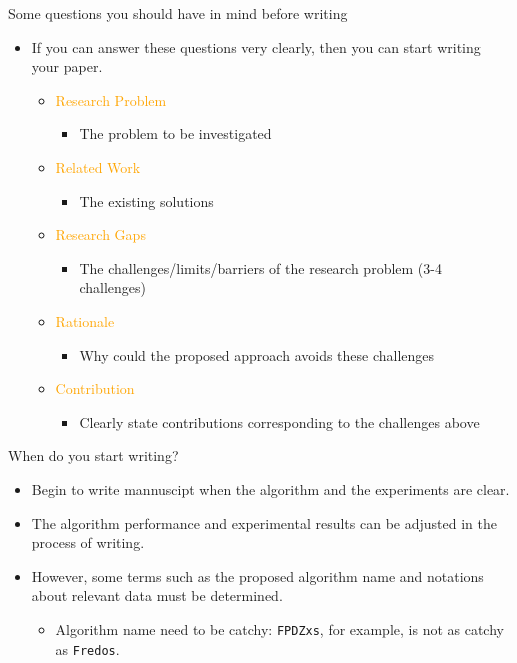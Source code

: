 \documentclass[
 size=14pt,
 paper=smartboard,  %
 mode=present, 		%
 display=slides, 	%
 style=tuliplab,  	%
 pauseslide,
 fleqn,leqno]{powerdot}{}
\begin{document}
\begin{slide}[toc=,bm=]{Some questions you should have in mind before writing}
	\begin{itemize}
		\item If you can answer these questions very clearly, then you can start writing your paper.
		\begin{itemize}
			\item \textcolor{orange}{Research Problem}
				\begin{itemize}
					\item The problem to be investigated
				\end{itemize}
			\item \textcolor{orange}{Related Work}
				\begin{itemize}
					\item The existing solutions
				\end{itemize}
			\item \textcolor{orange}{Research Gaps}
				\begin{itemize}
					\item The challenges/limits/barriers of the research problem (3-4 challenges)
				\end{itemize}
			\item \textcolor{orange}{Rationale}
				\begin{itemize}
					\item Why could the proposed approach avoids these challenges
				\end{itemize}	
			\item \textcolor{orange}{Contribution}
				\begin{itemize}
					\item Clearly state contributions corresponding to the challenges above	
				\end{itemize} 		
		\end{itemize}
	\end{itemize}	
\end{slide}


\begin{slide}[toc=,bm=]{When do you start writing?}
	\begin{itemize}
		\item Begin to write mannuscipt when the algorithm and the experiments are clear. 
		\item The algorithm performance and experimental results can be adjusted in the process of writing.
		\item However, some terms such as the proposed algorithm name and notations about relevant data must be determined.
			\begin{itemize}
				\item Algorithm name need to be catchy: \texttt{FPDZxs}, for example, is not as catchy as \texttt{Fredos}.
			\end{itemize}		
	\end{itemize}	
\end{slide}
\end{document}
